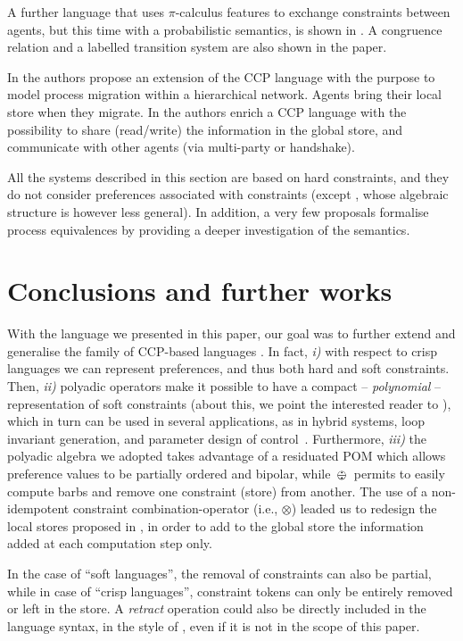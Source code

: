 \documentclass{llncs}
\def\odiv{\, {\ominus\hspace{-7.7pt} \div} \,}
\begin{document}
 A further language that uses $\pi$-calculus features to exchange constraints between agents, but this time with a probabilistic semantics, is shown in \cite{bortolussi}. A congruence relation and a labelled transition system are also shown in the paper. 

In \cite{catuscia} the authors propose an extension of the CCP language with the purpose to model process migration within a hierarchical network. Agents bring their local store when they migrate. In \cite{lubos} the authors enrich a CCP language with the possibility to share (read/write) the information in the global store, and communicate with other agents (via multi-party or handshake).

All the systems described in this section are based on hard constraints, and  they do not consider preferences associated with constraints (except \cite{buscemi}, whose algebraic structure is however less general). In addition, a very few proposals formalise process equivalences by providing a deeper investigation of the semantics.

\section{Conclusions and further works}\label{sec:conclusion}
With the language we presented in this paper, our goal was to further extend and generalise  the family of CCP-based languages . In fact, \emph{i)}  with respect to crisp languages we can  represent preferences, and thus both hard and soft constraints. Then, \emph{ii)} polyadic operators make it possible  to have a compact – \emph{polynomial} – representation of soft constraints (about this, we point the interested reader to \cite{festcatuscia}), which in turn can be used in several applications, as in hybrid systems, loop invariant generation, and parameter design of control~\cite{smtpolynomial}.  Furthermore, \emph{iii)} the polyadic algebra we adopted takes advantage of a residuated POM which allows preference values to be partially ordered and bipolar, while $\odiv$ permits to easily compute barbs and remove one constraint (store) from another. The use of a non-idempotent constraint combination-operator (i.e., $\otimes$) leaded us to redesign the local stores proposed in \cite{pippo}, in order to add to the global store the information added at each computation step only.

In the case of ``soft languages'', the removal of constraints can also be partial, while in case of ``crisp  languages'', constraint tokens can only be entirely removed or left in the store. A \emph{retract} operation could also be directly included in the language syntax, in the style of \cite{fun11,buscemi}, even if it is not in the scope of this paper.
\end{document}
